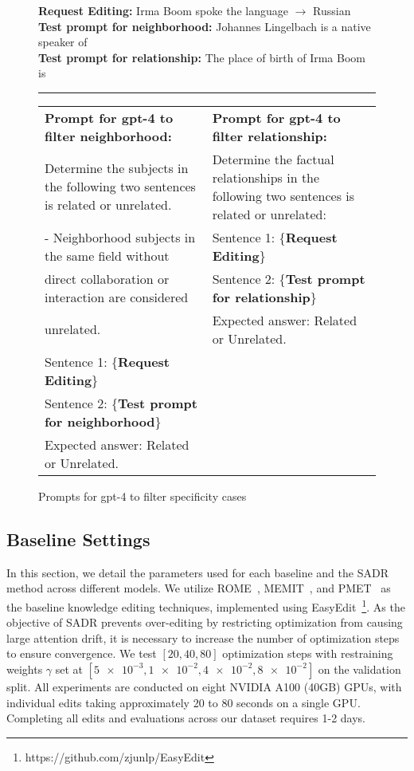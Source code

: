 \begin{figure}[htbp]
    \centering
    \begin{AcademicBox}
        \small
        \textbf{Request Editing:} Irma Boom spoke the language $\rightarrow$ Russian  \\
        \textbf{Test prompt for neighborhood:} Johannes Lingelbach is a native speaker of\\
        \textbf{Test prompt for relationship:} The place of birth of Irma Boom is \\
        \hrule \vspace{4pt}

        \sloppy
        \begin{tabular}{p{}|p{}}
            \textbf{Prompt for gpt-4 to filter neighborhood:} & \textbf{Prompt for gpt-4 to filter relationship:}\\ 
            Determine the subjects in the following two sentences is related or unrelated. &Determine the factual relationships in the following two sentences is related or unrelated: \\
            - Neighborhood subjects in the same field without & Sentence 1: \{\textbf{Request Editing}\} \\
            direct collaboration or interaction are considered & Sentence 2: \{\textbf{Test prompt for relationship}\} \\
            unrelated. & Expected answer: Related or Unrelated.\\
            Sentence 1: \{\textbf{Request Editing}\}  \\
            Sentence 2: \{\textbf{Test prompt for neighborhood}\} \\
            Expected answer: Related or Unrelated.\\
        \end{tabular}
    \end{AcademicBox}
    \caption{Prompts for gpt-4 to filter specificity cases}
    \label{fig:filt_prompt}
\end{figure}


\subsection{Baseline Settings}
\label{app:baseline_setting}
In this section, we detail the parameters used for each baseline and the SADR method across different models.
We utilize ROME~\citep{rome}, MEMIT~\citep{memit}, and PMET~\citep{pmet} as the baseline knowledge editing techniques, implemented using EasyEdit~\footnote{https://github.com/zjunlp/EasyEdit}.
As the objective of SADR prevents over-editing by restricting optimization from causing large attention drift, it is necessary to increase the number of optimization steps to ensure convergence.
We test $[20, 40, 80]$ optimization steps with restraining weights $\gamma$ set at $[\num{5e-3}, \num{1e-2}, \num{4e-2}, \num{8e-2}]$ on the validation split.
All experiments are conducted on eight NVIDIA A100 (40GB) GPUs, with individual edits taking approximately 20 to 80 seconds on a single GPU. Completing all edits and evaluations across our dataset requires 1-2 days.

